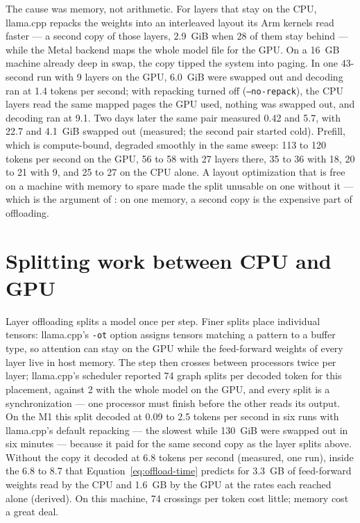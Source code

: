 The cause was memory, not arithmetic. For layers that stay on the CPU,
llama.cpp repacks the weights into an interleaved layout its Arm kernels read
faster --- a second copy of those layers, 2.9~GiB when 28 of them stay behind ---
while the Metal backend maps the whole model file for the GPU. On a 16~GB
machine already deep in swap, the copy tipped the system into paging. In one
43-second run with 9 layers on the GPU, 6.0~GiB were swapped out and decoding
ran at 1.4 tokens per second; with repacking turned off (\texttt{--no-repack}),
the CPU layers read the same mapped pages the GPU used, nothing was swapped out,
and decoding ran at 9.1. Two days later the same pair measured 0.42 and 5.7,
with 22.7 and 4.1~GiB swapped out (measured; the second pair started cold).
Prefill, which is compute-bound, degraded smoothly in the same sweep: 113 to
120 tokens per second on the GPU, 56 to 58 with 27 layers there, 35 to 36 with
18, 20 to 21 with 9, and 25 to 27 on the CPU alone. A layout optimization that is free on a machine
with memory to spare made the split unusable on one without it --- which is
the argument of : on one memory, a second copy is the
expensive part of offloading.

\section{Splitting work between CPU and GPU}

Layer offloading splits a model once per step. Finer splits place individual
tensors: llama.cpp's \texttt{-ot} option assigns tensors matching a pattern to
a buffer type, so attention can stay on the GPU while the feed-forward weights
of every layer live in host memory. The step then crosses between processors
twice per layer; llama.cpp's scheduler reported 74 graph splits per decoded
token for this placement, against 2 with the whole model on the GPU, and every
split is a synchronization --- one processor must finish before the other reads
its output. On the M1 this split decoded at 0.09 to 2.5 tokens per second in
six runs with llama.cpp's default repacking --- the slowest while 130~GiB were
swapped out in six minutes --- because it paid for the same second copy as the
layer splits above. Without the copy it decoded at 6.8 tokens per second
(measured, one run), inside the 6.8 to 8.7 that
Equation~\ref{eq:offload-time} predicts for 3.3~GB of feed-forward weights read
by the CPU and 1.6~GB by the GPU at the rates each reached alone (derived). On
this machine, 74 crossings per token cost little; memory cost a great deal.

